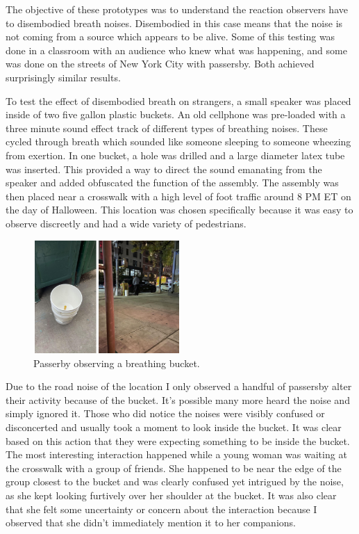 \documentclass[letterpaper]{article}
\begin{document}
The objective of these prototypes was to understand the reaction observers have to disembodied breath noises. Disembodied in this case means that the noise is not coming from a source which appears to be alive. Some of this testing was done in a classroom with an audience who knew what was happening, and some was done on the streets of New York City with passersby. Both achieved surprisingly similar results. 

To test the effect of disembodied breath on strangers, a small speaker was placed inside of two five gallon plastic buckets. An old cellphone was pre-loaded with a three minute sound effect track of different types of breathing noises. These cycled through breath which sounded like someone sleeping to someone wheezing from exertion. In one bucket, a hole was drilled and a large diameter latex tube was inserted. This provided a way to direct the sound emanating from the speaker and added obfuscated the function of the assembly. The assembly was then placed near a crosswalk with a high level of foot traffic around 8 PM ET on the day of Halloween. This location was chosen specifically because it was easy to observe discreetly and had a wide variety of pedestrians. 

\begin{figure}[h]
\includegraphics[width=0.5\textwidth]{images/buckettest.png}
\caption{Passerby observing a breathing bucket.}
\end{figure}

Due to the road noise of the location I only observed a handful of passersby alter their activity because of the bucket. It's possible many more heard the noise and simply ignored it. Those who did notice the noises were visibly confused or disconcerted and usually took a moment to look inside the bucket. It was clear based on this action that they were expecting something to be inside the bucket. The most interesting interaction happened while a young woman was waiting at the crosswalk with a group of friends. She happened to be near the edge of the group closest to the bucket and was clearly confused yet intrigued by the noise, as she kept looking furtively over her shoulder at the bucket. It was also clear that she felt some uncertainty or concern about the interaction because I observed that she didn’t immediately mention it to her companions.
\end{document}

